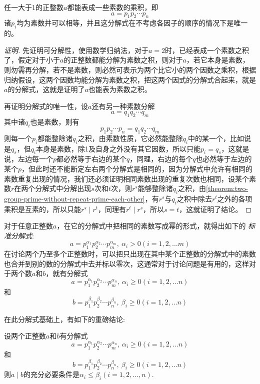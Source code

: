 \begin{theorem}[算术基本定理]
  \label{theorem:arithmetic-base-theorem}
  任一大于1的正整数$a$都能表成一些素数的乘积，即
  \[ a=p_1p_2 \cdots p_n \]
  诸$p_i$均为素数并可以相等，并且这分解式在不考虑各因子的顺序的情况下是唯一的。
\end{theorem}

\begin{proof}[证明]
  先证明可分解性，使用数学归纳法，对于$a=2$时，已经表成一个素数之积了，假定对于小于$a$的正整数都能分解为素数之积，则对于$a$，若它本身是素数，则勿需再分解，若不是素数，则必然可表示为两个比它小的两个因数之乘积，根据归纳假设，这两个因数均能分解为素数之积，把这两个因式的分解式合起来，就是$a$的分解式，这就是证明了$a$也能表为素数之积。

  再证明分解式的唯一性，设$a$还有另一种素数分解
  \[ a=q_1q_2 \cdots q_m \]
  其中诸$q_i$也是素数，则有
  \[ p_1p_2 \cdots p_n = q_1q_2 \cdots q_m \]
  则每一个$p_i$都能整除诸$q_i$之积，由素数性质，它必然能整除$q_i$中的某一个，比如说是$q_s$，但$q_i$本身是素数，除1及自身之外没有其它因数，所以只能$p_i=q_s$，这就是说，左边每一个$p$都必然等于右边的某个$q$，同理，右边的每个$q$也必然等于左边的某个$p$，但此时还不能断定左右两个分解式是相同的，因为分解式中允许有相同的素数重复出现的情况，我们还必须证明相同素数出现的重复次数也相同，设某个素数$r$在两个分解式中分解出现$s$次和$t$次，则$r^s$能够整除诸$q_i$之积，由\autoref{theorem:two-group-prime-without-repeat-prime-each-other}，有$r^s$与$q_i$之积中除去$r^t$之外的各项乘积是互素的，所以只能$r^s \mid r^t$，同理有$r^t \mid r^s$，所以$s=t$，这就证明了结论。
\end{proof}

对于任意正整数$a$，在它的分解式中把相同的素数写成幂的形式，就得出如下的 \emph{标准分解式}:
\[ a = p_1^{\alpha_1}p_2^{\alpha_2} \cdots p_m^{\alpha_m}, \  \alpha_i > 0 (i=1,2,\ldots m) \]
在讨论两个乃至多个正整数时，可以把只出现在其中某个正整数的分解式中的素数也合并到别的数的分解式中去并标以零次，这通常对于讨论问题是有用的，这样对于两个数$a$和$b$，就有分解式
\[ a = p_1^{\alpha_1}p_2^{\alpha_2} \cdots p_m^{\alpha_n}, \  \alpha_i \geqslant 0 (i=1,2,\ldots n) \]
和
\[ b = p_1^{\beta_1}p_2^{\beta_2} \cdots p_n^{\beta_n}, \  \beta_i \geqslant 0 (i=1,2,\ldots n) \]

在此分解式基础上，有如下的重磅结论:
\begin{theorem}
  \label{theorem:integer-division-with-prime-decompose}
  设两个正整数$a$和$b$有分解式
\[ a = p_1^{\alpha_1}p_2^{\alpha_2} \cdots p_m^{\alpha_n}, \  \alpha_i \geqslant 0 (i=1,2,\ldots n) \]
和
\[ b = p_1^{\beta_1}p_2^{\beta_2} \cdots p_n^{\beta_n}, \  \beta_i \geqslant 0 (i=1,2,\ldots n) \]
  则$a \mid b$的充分必要条件是$\alpha_i \leqslant \beta_i(i=1,2,\ldots,n)$.
\end{theorem}

